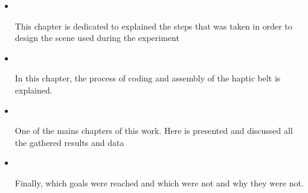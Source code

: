 \begin{itemize}
    \item {\large\textbf{{~}}}
        
        This chapter is dedicated to explained the steps that was taken in order to design the scene used during the experiment
        
    \item {\large\textbf{{~}}}
        
        In this chapter, the process of coding and assembly of the haptic belt is explained.
        
    \item {\large\textbf{{~}}}
    
        One of the mains chapters of this work. Here is presented and discussed all the gathered results and data
    
    \item {\large\textbf{{~}}}
    
        Finally, which goals were reached and which were not and why they were not.
    
\end{itemize}



